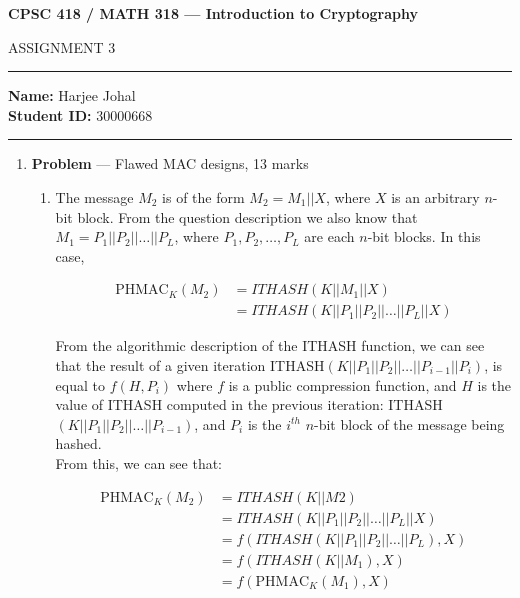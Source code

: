 \documentclass[11pt]{article}
\theoremstyle{definition}
\newcounter{problem}
\newcommand{\PHMAC}{\mathrm{PHMAC}}
\begin{document}
\begin{center}
{\bf \Large CPSC 418 / MATH 318 --- Introduction to Cryptography

ASSIGNMENT 3 }
\end{center}

\hrule 	

\textbf{Name:} Harjee Johal \\
\textbf{Student ID:} 30000668

\medskip \hrule

\begin{enumerate} \itemsep 20pt

\item[] \textbf{Problem \theproblem} --- Flawed MAC designs, 13 marks

\begin{enumerate}

\item The message $M_2$ is of the form $M_2 = M_1 || X$, where $X$ is an arbitrary $n$-bit block. From
the question description we also know that $M_1 = P_1 || P_2 || \ldots || P_L$, where $P_1, P_2, \ldots, P_L$ are
each $n$-bit blocks. In this case, 

\begin{align*}
    \PHMAC_K{(M_2)} &= ITHASH(K || M_1 || X) \\
    &= ITHASH(K || P_1 || P_2 || \ldots || P_L || X)
\end{align*}

From the algorithmic description of the ITHASH function, we can see that the result of a given iteration ITHASH$(K || P_1 || P_2 || \ldots || P_{i - 1} || P_i)$, is equal to $f(H, P_i)$ where $f$ is a public compression function, and $H$ is the value of ITHASH computed in the previous iteration: ITHASH$(K || P_1 || P_2 || \ldots || P_{i - 1})$, and $P_i$ is the $i^{th}$ $n$-bit block of the message being hashed. \\

From this, we can see that:

\begin{align*}
    \PHMAC_K{(M_2)} &= ITHASH(K || M2) \\
    &= ITHASH(K || P_1 || P_2 || \ldots || P_L || X) \\
    &= f(ITHASH(K || P_1 || P_2 || \ldots || P_L), X) \\
    &= f(ITHASH(K || M_1), X) \\
    &= f(\PHMAC_K{(M_1)}, X)
\end{align*}


\end{enumerate}
\end{enumerate}
\end{document}
